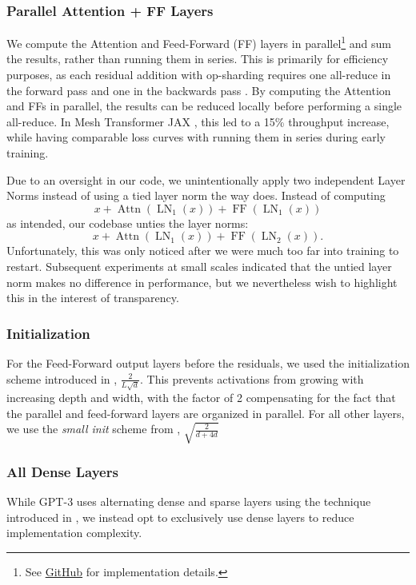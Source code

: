 \documentclass[11pt]{article}
\DeclareMathOperator{\Attn}{Attn}
\DeclareMathOperator{\LN}{LN}
\DeclareMathOperator{\FF}{FF}
\begin{document}
\subsubsection{Parallel Attention + FF Layers}
\label{subsubsec:parallel-ff}
We compute the Attention and Feed-Forward (FF) layers in parallel\footnote{See \href{https://github.com/EleutherAI/gpt-neox/blob/ac3d8087f1762213880523893a52329d66d2d1a9/megatron/model/transformer.py\#L593}{GitHub} for implementation details.} and sum the results, rather than running them in series. This is primarily for efficiency purposes, as each residual addition with op-sharding requires one all-reduce in the forward pass and one in the backwards pass \citep{shoeybi2020megatronlm}. By computing the Attention and FFs in parallel, the results can be reduced locally before performing a single all-reduce. In Mesh Transformer JAX \citep{mesh-transformer-jax}, this led to a 15\% throughput increase, while having comparable loss curves with running them in series during early training.

Due to an oversight in our code, we unintentionally apply two independent Layer Norms instead of using a tied layer norm the way \citet{gpt-j} does. Instead of computing \[x + \Attn(\LN_1(x)) + \FF(\LN_1(x))\] as intended, our codebase unties the layer norms:
\[x + \Attn(\LN_1(x)) + \FF(\LN_2(x)).\] Unfortunately, this was only noticed after we were much too far into training to restart. Subsequent experiments at small scales indicated that the untied layer norm makes no difference in performance, but we nevertheless wish to highlight this in the interest of transparency.

\subsubsection{Initialization}
\label{subsubsec:init}

For the Feed-Forward output layers before the residuals, we used the initialization scheme introduced in \citet{mesh-transformer-jax}, $\frac{2}{L\sqrt{d}}$. This prevents activations from growing with increasing depth and width, with the factor of 2 compensating for the fact that the parallel and feed-forward layers are organized in parallel. For all other layers, we use the \textit{small init} scheme from \citet{transformers-without-tears}, $\sqrt{\frac{2}{d+4d}}$

\subsubsection{All Dense Layers}
\label{subsubsec:dense-layers}
While GPT-3 uses alternating dense and sparse layers using the technique introduced in \citet{child2019generating}, we instead opt to exclusively use dense layers to reduce implementation complexity.
\end{document}
